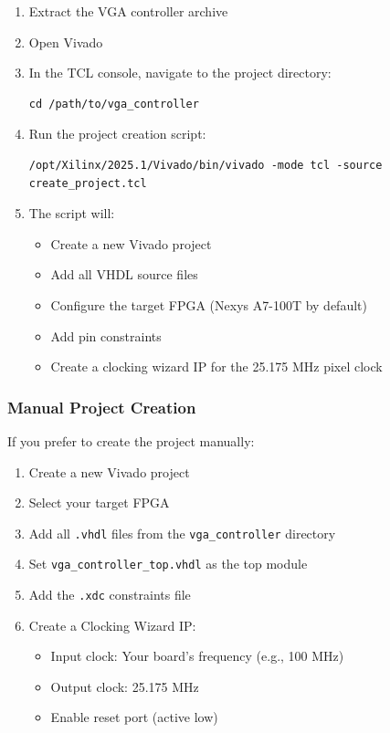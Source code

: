 \documentclass[11pt,letterpaper]{report}
\begin{document}
\begin{enumerate}
    \item Extract the VGA controller archive
    \item Open Vivado
    \item In the TCL console, navigate to the project directory:
    \begin{lstlisting}[style=c]
cd /path/to/vga_controller
    \end{lstlisting}
    
    \item Run the project creation script:
    \begin{lstlisting}[style=c]
/opt/Xilinx/2025.1/Vivado/bin/vivado -mode tcl -source create_project.tcl 
    \end{lstlisting}
    
    \item The script will:
    \begin{itemize}
        \item Create a new Vivado project
        \item Add all VHDL source files
        \item Configure the target FPGA (Nexys A7-100T by default)
        \item Add pin constraints
        \item Create a clocking wizard IP for the 25.175 MHz pixel clock
    \end{itemize}
\end{enumerate}

\subsubsection{Manual Project Creation}

If you prefer to create the project manually:

\begin{enumerate}
    \item Create a new Vivado project
    \item Select your target FPGA
    \item Add all \texttt{.vhdl} files from the \texttt{vga\_controller} directory
    \item Set \texttt{vga\_controller\_top.vhdl} as the top module
    \item Add the \texttt{.xdc} constraints file
    \item Create a Clocking Wizard IP:
    \begin{itemize}
        \item Input clock: Your board's frequency (e.g., 100 MHz)
        \item Output clock: 25.175 MHz
        \item Enable reset port (active low)
    \end{itemize}
\end{enumerate}
\end{document}

